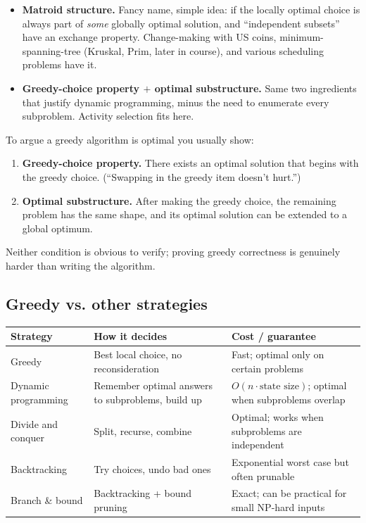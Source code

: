 \documentclass[11pt]{article}
\begin{document}
\begin{itemize}[leftmargin=*]
    \item \textbf{Matroid structure.} Fancy name, simple idea: if the
          locally optimal choice is always part of \emph{some}
          globally optimal solution, and ``independent subsets'' have
          an exchange property. Change-making with US coins,
          minimum-spanning-tree (Kruskal, Prim, later in course), and
          various scheduling problems have it.
    \item \textbf{Greedy-choice property $+$ optimal substructure.}
          Same two ingredients that justify dynamic programming,
          minus the need to enumerate every subproblem. Activity
          selection fits here.
\end{itemize}

\begin{ideabox}
To argue a greedy algorithm is optimal you usually show:
\begin{enumerate}[leftmargin=*,noitemsep]
    \item \textbf{Greedy-choice property.} There exists an optimal
          solution that begins with the greedy choice. (``Swapping in
          the greedy item doesn't hurt.'')
    \item \textbf{Optimal substructure.} After making the greedy
          choice, the remaining problem has the same shape, and its
          optimal solution can be extended to a global optimum.
\end{enumerate}
Neither condition is obvious to verify; proving greedy correctness
is genuinely harder than writing the algorithm.
\end{ideabox}

\subsection{Greedy vs. other strategies}

\begin{center}
\small
\begin{tabular}{p{3.4cm} p{4cm} p{4.6cm}}
\textbf{Strategy} & \textbf{How it decides} & \textbf{Cost / guarantee} \\
\hline
Greedy & Best local choice, no reconsideration & Fast; optimal only
on certain problems \\
Dynamic programming & Remember optimal answers to subproblems, build
up & $O(n \cdot \text{state size})$; optimal when subproblems
overlap \\
Divide and conquer & Split, recurse, combine & Optimal; works when
subproblems are independent \\
Backtracking & Try choices, undo bad ones & Exponential worst case
but often prunable \\
Branch \& bound & Backtracking + bound pruning & Exact; can be
practical for small NP-hard inputs \\
\end{tabular}
\normalsize
\end{center}
\end{document}
